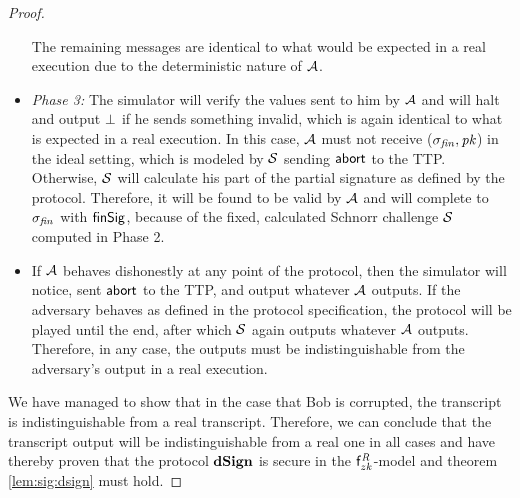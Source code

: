 \begin{proof}
\begin{itemize}
        The remaining messages are identical to what would be expected in a real execution due to the deterministic nature of $\mathcal{A}$.
        \item \textit{Phase 3: } The simulator will verify the values sent to him by $\mathcal{A}$ and will halt and output $\bot$ if he sends something invalid, which is again identical to what is expected in a real execution.
        In this case, $\mathcal{A}$ must not receive ($\sigma_{\mathit{fin}}, \mathit{pk}$) in the ideal setting, which is modeled by $\mathcal{S}$ sending $\mathsf{abort}$ to the TTP.
        Otherwise, $\mathcal{S}$ will calculate his part of the partial signature as defined by the protocol.
        Therefore, it will be found to be valid by $\mathcal{A}$ and will complete to $\sigma_{\mathit{fin}}$ with $\mathsf{finSig}$, because of the fixed, calculated Schnorr challenge $\mathcal{S}$ computed in Phase 2.
        \item If $\mathcal{A}$ behaves dishonestly at any point of the protocol, then the simulator will notice, sent $\mathsf{abort}$ to the TTP, and output whatever $\mathcal{A}$ outputs.
        If the adversary behaves as defined in the protocol specification, the protocol will be played until the end, after which $\mathcal{S}$ again outputs whatever $\mathcal{A}$ outputs.
        Therefore, in any case, the outputs must be indistinguishable from the adversary's output in a real execution.
    \end{itemize}

    We have managed to show that in the case that Bob is corrupted, the transcript is indistinguishable from a real transcript.
    Therefore, we can conclude that the transcript output will be indistinguishable from a real one in all cases and have thereby proven that the protocol $\mathbf{dSign}$ is secure in the $\mathsf{f}^{\mathit{R}}_{zk}$-model and theorem \cref{lem:sig:dsign} must hold.
\end{proof}


